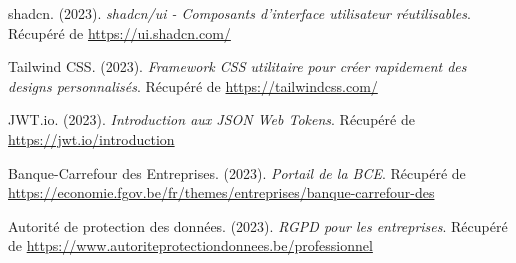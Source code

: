 \begin{thebibliography}{99}
shadcn. (2023).
\textit{shadcn/ui - Composants d'interface utilisateur réutilisables}.
Récupéré de \url{https://ui.shadcn.com/}

Tailwind CSS. (2023).
\textit{Framework CSS utilitaire pour créer rapidement des designs personnalisés}.
Récupéré de \url{https://tailwindcss.com/}

JWT.io. (2023).
\textit{Introduction aux JSON Web Tokens}.
Récupéré de \url{https://jwt.io/introduction}

Banque-Carrefour des Entreprises. (2023).
\textit{Portail de la BCE}.
Récupéré de \url{https://economie.fgov.be/fr/themes/entreprises/banque-carrefour-des}

Autorité de protection des données. (2023).
\textit{RGPD pour les entreprises}.
Récupéré de \url{https://www.autoriteprotectiondonnees.be/professionnel}

\end{thebibliography}